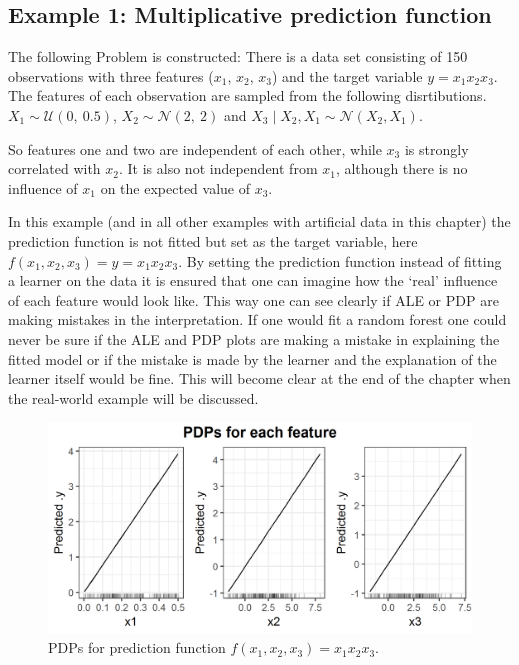 \documentclass[
]{krantz}
\begin{document}
\hypertarget{example-1-multiplicative-prediction-function}{%
\subsection{Example 1: Multiplicative prediction function}\label{example-1-multiplicative-prediction-function}}

The following Problem is constructed: There is a data set consisting of 150 observations with three features (\(x_1\), \(x_2\), \(x_3\)) and the target variable \(y = x_1 x_2 x_3\).
The features of each observation are sampled from the following disrtibutions.
\(X_1 \sim \mathcal{U}(0,~0.5)\), \(X_2 \sim \mathcal{N}(2,~2)\) and \(X_3\mid X_2, X_1 \sim \mathcal{N}(X_2,X_1)\).

So features one and two are independent of each other, while \(x_3\) is strongly correlated with \(x_2\). It is also not independent from \(x_1\), although there is no influence of \(x_1\) on the expected value of \(x_3\).

In this example (and in all other examples with artificial data in this chapter) the prediction function is not fitted but set as the target variable, here \(f(x_1, x_2, x_3) = y = x_1 x_2 x_3\). By setting the prediction function instead of fitting a learner on the data it is ensured that one can imagine how the `real' influence of each feature would look like. This way one can see clearly if ALE or PDP are making mistakes in the interpretation. If one would fit a random forest one could never be sure if the ALE and PDP plots are making a mistake in explaining the fitted model or if the mistake is made by the learner and the explanation of the learner itself would be fine. This will become clear at the end of the chapter when the real-world example will be discussed.

\begin{figure}
\includegraphics[width=1\linewidth]{images/ale_1_PDPs_x1x2x3_150_0_0p5_2_2} \caption{PDPs for prediction function \(f(x_1, x_2, x_3) = x_1 x_2 x_3\).}\label{fig:pdpsx1x2x3}
\end{figure}
\end{document}
